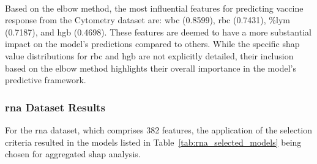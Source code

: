\documentclass[12pt,a4paper]{report}
\begin{document}
\\
Based on the elbow method, the most influential features for predicting vaccine response from the Cytometry dataset are: \gls{wbc} (0.8599), \acrshort{rbc} (0.7431), \%\acrshort{lym} (0.7187), and \acrshort{hgb} (0.4698). These features are deemed to have a more substantial impact on the model's predictions compared to others. While the specific \gls{shap} value distributions for \acrshort{rbc} and \acrshort{hgb} are not explicitly detailed, their inclusion based on the elbow method highlights their overall importance in the model's predictive framework.


\subsubsection*{\acrshort{rna} Dataset Results}
\noindent
For the \acrshort{rna} dataset, which comprises 382 features, the application of the selection criteria resulted in the models listed in Table~\ref{tab:rna_selected_models} being chosen for aggregated \gls{shap} analysis.
\end{document}
